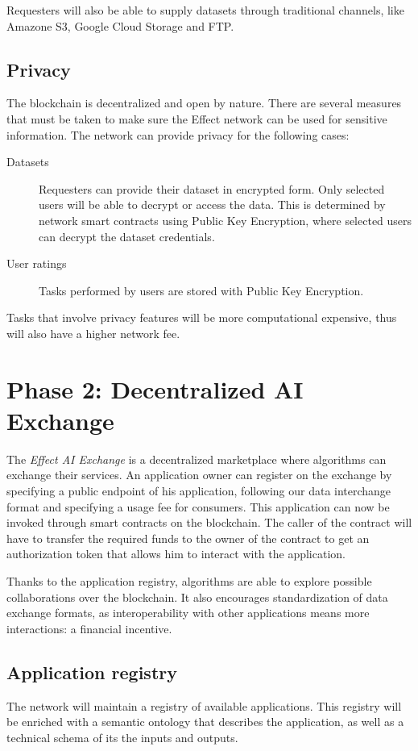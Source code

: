 \documentclass{article}
\begin{document}
Requesters will also be able to supply datasets through traditional
channels, like Amazone S3, Google Cloud Storage and FTP.

\subsection{Privacy}
The blockchain is decentralized and open by nature. There are several
measures that must be taken to make sure the Effect network can be
used for sensitive information. The network can provide privacy for
the following cases:

\begin{description}
\item[Datasets] Requesters can provide their dataset in encrypted
  form. Only selected users will be able to decrypt or access the
  data. This is determined by network smart contracts using Public Key
  Encryption, where selected users can decrypt the dataset
  credentials.
\item[User ratings] Tasks performed by users are stored with Public
  Key Encryption. 
\end{description}

Tasks that involve privacy features will be more computational
expensive, thus will also have a higher network fee.

\section{Phase 2: Decentralized AI Exchange}
\label{sec:phase2}

The \emph{Effect AI Exchange} is a decentralized marketplace where
algorithms can exchange their services. An application owner can
register on the exchange by specifying a public endpoint of his
application, following our data interchange format and specifying a
usage fee for consumers. This application can now be invoked through
smart contracts on the blockchain. The caller of the contract will
have to transfer the required funds to the owner of the contract to
get an authorization token that allows him to interact with the application.

Thanks to the application registry, algorithms are able to explore
possible collaborations over the blockchain. It also encourages
standardization of data exchange formats, as interoperability with
other applications means more interactions: a financial incentive.

\subsection{Application registry}
The network will maintain a registry of available applications. This
registry will be enriched with a semantic ontology that describes the
application, as well as a technical schema of its the inputs and
outputs.
\end{document}
